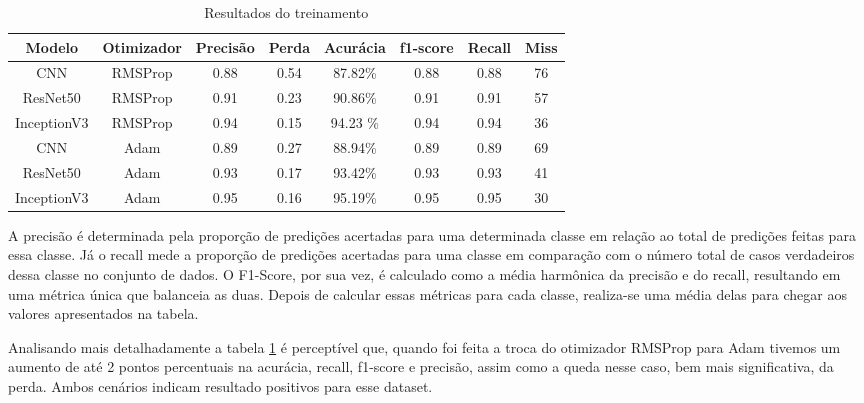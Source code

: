 \begin{table}[!h]
    \centering
    \renewcommand{\arraystretch}{1.5} %
    \begin{tabular}{c|c|c|c|c|c|c|c}
       Modelo  & Otimizador & Precisão & Perda & Acurácia & f1-score & Recall & Miss \\
         \hline  
        CNN & RMSProp & 0.88 & 0.54 & 87.82\% & 0.88 & 0.88 & 76 \\
        ResNet50 & RMSProp & 0.91 & 0.23 & 90.86\% & 0.91 & 0.91 & 57\\ 
        InceptionV3 & RMSProp & 0.94 & 0.15 & 94.23 \% & 0.94 & 0.94 & 36 \\
        CNN & Adam & 0.89 & 0.27& 88.94\% &  0.89 &  0.89 & 69 \\
        ResNet50 & Adam & 0.93 & 0.17 & 93.42\% & 0.93 & 0.93 & 41 \\
        \cellcolor{green!25}InceptionV3 & \cellcolor{green!25}Adam & \cellcolor{green!25}0.95 &  \cellcolor{green!25}0.16 &  \cellcolor{green!25}95.19\% & \cellcolor{green!25}0.95 & \cellcolor{green!25}0.95 &  \cellcolor{green!25}30  
    \end{tabular}
    \caption{Resultados do treinamento}
    \label{tab:resultados_tabela}
\end{table}

A precisão é determinada pela proporção de predições acertadas para uma determinada classe em relação ao total de predições feitas para essa classe. Já o recall mede a proporção de predições acertadas para uma classe em comparação com o número total de casos verdadeiros dessa classe no conjunto de dados. O F1-Score, por sua vez, é calculado como a média harmônica da precisão e do recall, resultando em uma métrica única que balanceia as duas. Depois de calcular essas métricas para cada classe, realiza-se uma média delas para chegar aos valores apresentados na tabela.

Analisando mais detalhadamente a tabela \ref{tab:resultados_tabela} é perceptível que, quando foi feita a troca do otimizador RMSProp para Adam tivemos um aumento de até 2 pontos percentuais na acurácia, recall, f1-score e precisão, assim como a queda nesse caso, bem mais significativa, da perda. Ambos cenários indicam resultado positivos para esse dataset.

